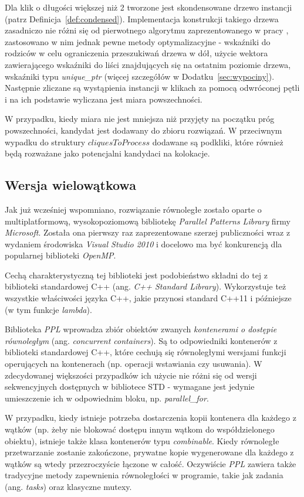 \documentclass[12pt]{article}
\newcounter{algorytm}
\begin{document}
Dla klik o długości większej niż 2 tworzone jest skondensowane drzewo instancji (patrz Definicja~\ref{def:condensed}). Implementacja konstrukcji takiego drzewa zasadniczo nie różni się od pierwotnego algorytmu zaprezentowanego w pracy \cite{chinczyki}, zastosowano w nim jednak pewne metody optymalizacyjne - wskaźniki do rodziców w celu ograniczenia przeszukiwań drzewa w dół, użycie wektora zawierającego wskaźniki do liści znajdujących się na ostatnim poziomie drzewa, wskaźniki typu \textit{unique\_ptr} (więcej szczegółów w Dodatku~\ref{sec:wypociny}). Następnie zliczane są wystąpienia instancji w klikach za pomocą odwróconej pętli i na ich podstawie wyliczana jest miara powszechności.

W przypadku, kiedy miara nie jest mniejsza niż przyjęty na początku próg powszechności, kandydat jest dodawany do zbioru rozwiązań. W przeciwnym wypadku do struktury $ cliquesToProcess $ dodawane są podkliki, które również będą rozważane jako potencjalni kandydaci na kolokacje.

\subsection{Wersja wielowątkowa}

Jak już wcześniej wspomniano, rozwiązanie równoległe zostało oparte o multiplatformową, wysokopoziomową bibliotekę \textit{Parallel Patterns Library} firmy \textit{Microsoft}. Została ona pierwszy raz zaprezentowane szerzej publiczności wraz z wydaniem środowiska \textit{Visual Studio 2010} i docelowo ma być konkurencją dla popularnej biblioteki \textit{OpenMP}. 

Cechą charakterystyczną tej biblioteki jest podobieństwo składni do tej z biblioteki standardowej C++ (ang. \textit{C++ Standard Library}). Wykorzystuje też wszystkie właściwości języka C++, jakie przynosi standard C++11 i późniejsze (w tym funkcje \textit{lambda}).

Biblioteka \textit{PPL} wprowadza zbiór obiektów zwanych \textit{kontenerami o dostępie równoległym} (ang. \textit{concurrent containers}). Są to odpowiedniki kontenerów z biblioteki standardowej C++, które cechują się równoległymi wersjami funkcji operujących na kontenerach (np. operacji wstawiania czy usuwania). W zdecydowanej większości przypadków ich użycie nie różni się od wersji sekwencyjnych dostępnych w bibliotece STD - wymagane jest jedynie umieszczenie ich w odpowiednim bloku, np. \textit{parallel\_for}. 

W przypadku, kiedy istnieje potrzeba dostarczenia kopii kontenera dla każdego z wątków (np. żeby nie blokować dostępu innym wątkom do współdzielonego obiektu), istnieje także klasa kontenerów typu \textit{combinable}. Kiedy równoległe przetwarzanie zostanie zakończone, prywatne kopie wygenerowane dla każdego z wątków są wtedy przezroczyście łączone w całość. Oczywiście \textit{PPL} zawiera także tradycyjne metody zapewnienia równoległości w programie, takie jak zadania (ang. \textit{tasks}) oraz klasyczne mutexy.
\end{document}
